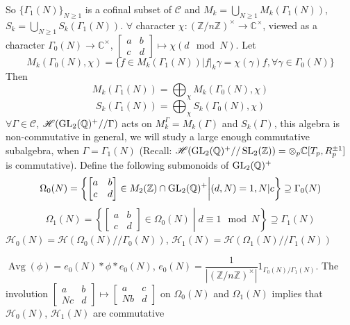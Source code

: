 \documentclass[main]{subfiles}
\begin{document}
So $\{\Gamma_1(N)\}_{N\geq1}$ is a cofinal subset of $\mathscr C$ and $M_k=\bigcup_{N\geq1}M_k(\Gamma_1(N))$, $S_k=\bigcup_{N\geq1}S_k(\Gamma_1(N))$. $\forall$ character $\chi:(\mathbb Z/n\mathbb Z)^\times\to\mathbb C^\times$, viewed as a character $\Gamma_0(N)\to\mathbb C^\times$, $\begin{bmatrix}
a&b\\
c&d
\end{bmatrix}\mapsto\chi(d\mod N)$. Let
\[M_k(\Gamma_0(N),\chi)=\{f\in M_k(\Gamma_1(N))|f|_k\gamma=\chi(\gamma)f,\forall\gamma\in\Gamma_0(N)\}\]
Then
\[M_k(\Gamma_1(N))=\bigoplus_{\chi}M_k(\Gamma_0(N),\chi)\]
\[S_k(\Gamma_1(N))=\bigoplus_{\chi}S_k(\Gamma_0(N),\chi)\]
$\forall\Gamma\in\mathscr C$, $\mathscr H(\operatorname{GL}_2(\mathbb Q)^+//\Gamma)$ acts on $M_k^\Gamma=M_k(\Gamma)$ and $S_k(\Gamma)$, this algebra is non-commutative in general, we will study a large enough commutative subalgebra, when $\Gamma=\Gamma_1(N)$ (Recall: $\mathscr H(\operatorname{GL}_2(\mathbb Q)^+//\operatorname{SL}_2(\mathbb Z))=\otimes_p\mathbb C[T_p,R_p^{\pm1}]$ is commutative). Define the following submonoids of $\operatorname{GL}_2(\mathbb Q)^+$
\[\Omega_0(N)=\left\{\begin{bmatrix}
a&b\\
c&d
\end{bmatrix}\in M_2(\mathbb Z)\cap\operatorname{GL}_2(\mathbb Q)^+\middle|(d,N)=1,N|c\right\}\supseteq\Gamma_0(N)\]
\[\Omega_1(N)=\left\{\begin{bmatrix}
a&b\\
c&d
\end{bmatrix}\in \Omega_0(N)\middle|d\equiv1\mod N\right\}\supseteq\Gamma_1(N)\]
$\mathscr H_0(N)=\mathscr H(\Omega_0(N)//\Gamma_0(N))$, $\mathscr H_1(N)=\mathscr H(\Omega_1(N)//\Gamma_1(N))$
\begin{center}
\end{center}
$\operatorname{Avg}(\phi)=e_0(N)*\phi*e_0(N)$, $e_0(N)=\dfrac{1}{|(\mathbb Z/n\mathbb Z)^\times|}1_{\Gamma_0(N)/\Gamma_1(N)}$. The involution $\begin{bmatrix}
a&b\\
Nc&d
\end{bmatrix}\mapsto\begin{bmatrix}
a&c\\
Nb&d
\end{bmatrix}$ on $\Omega_0(N)$ and $\Omega_1(N)$ implies that $\mathscr H_0(N)$, $\mathscr H_1(N)$ are commutative
\end{document}
